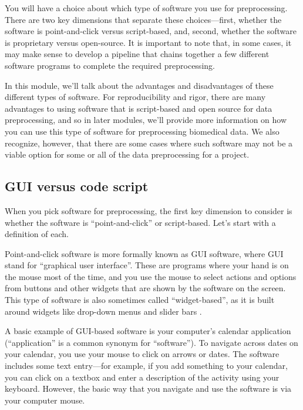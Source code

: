 \documentclass[]{tufte-book}
\begin{document}
You will have a choice about which type of software you use for preprocessing.
There are two key dimensions that separate these choices---first, whether the
software is point-and-click versus script-based, and, second, whether the
software is proprietary versus open-source. It is important to note
that, in some cases, it may make sense to develop a pipeline that chains
together a few different software programs to complete the required
preprocessing.

In this module, we'll talk about the advantages and disadvantages of these
different types of software. For reproducibility and rigor, there are many
advantages to using software that is script-based and open source for data
preprocessing, and so in later modules, we'll provide more information on how
you can use this type of software for preprocessing biomedical data. We also
recognize, however, that there are some cases where such software may not be a
viable option for some or all of the data preprocessing for a project.

\subsection{GUI versus code script}\label{gui-versus-code-script}

When you pick software for preprocessing, the first key dimension to consider
is whether the software is ``point-and-click'' or script-based.
Let's start with a definition of each.

Point-and-click software is more formally known as GUI software, where GUI stand
for ``graphical user interface''. These are programs where your hand is on the
mouse most of the time, and you use the mouse to select actions and options from
buttons and other widgets that are shown by the software on the screen. This
type of software is also sometimes called ``widget-based'', as it is built around
widgets like drop-down menus and slider bars \citep{perkel2018future}.

A basic example of GUI-based software is your computer's calendar application
(``application'' is a common synonym for ``software''). To navigate across dates on
your calendar, you use your mouse to click on arrows or dates.
The software includes some text entry---for example, if you add something to
your calendar, you can click on a textbox and enter a description of the
activity using your keyboard. However, the basic way that you navigate and use
the software is via your computer mouse.
\end{document}
